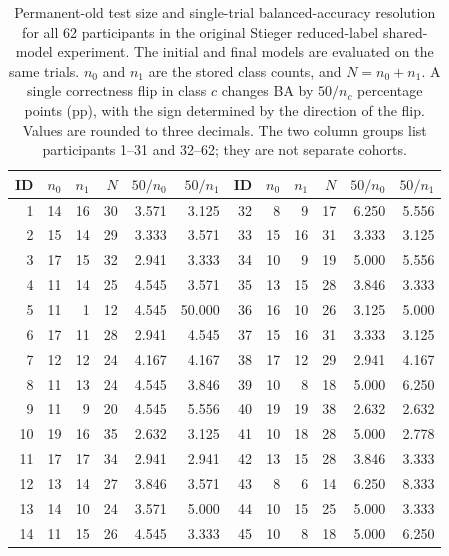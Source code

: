 \documentclass[11pt,a4paper]{article}
\begin{document}
\begin{table}[htbp]
\centering
\small
\setlength{\tabcolsep}{3pt}
\caption{Permanent-old test size and single-trial balanced-accuracy resolution for all 62 participants in the original Stieger reduced-label shared-model experiment. The initial and final models are evaluated on the same trials. $n_0$ and $n_1$ are the stored class counts, and $N=n_0+n_1$. A single correctness flip in class $c$ changes BA by $50/n_c$ percentage points (pp), with the sign determined by the direction of the flip. Values are rounded to three decimals. The two column groups list participants 1--31 and 32--62; they are not separate cohorts.}
\label{tab:old-test-resolution}
\begin{tabular}{@{}rrrrrr@{\hspace{9pt}}rrrrrr@{}}
\toprule
ID & $n_0$ & $n_1$ & $N$ & $50/n_0$ & $50/n_1$ & ID & $n_0$ & $n_1$ & $N$ & $50/n_0$ & $50/n_1$\\
\midrule
1 & 14 & 16 & 30 & 3.571 & 3.125 & 32 & 8 & 9 & 17 & 6.250 & 5.556\\
2 & 15 & 14 & 29 & 3.333 & 3.571 & 33 & 15 & 16 & 31 & 3.333 & 3.125\\
3 & 17 & 15 & 32 & 2.941 & 3.333 & 34 & 10 & 9 & 19 & 5.000 & 5.556\\
4 & 11 & 14 & 25 & 4.545 & 3.571 & 35 & 13 & 15 & 28 & 3.846 & 3.333\\
5 & 11 & 1 & 12 & 4.545 & 50.000 & 36 & 16 & 10 & 26 & 3.125 & 5.000\\
6 & 17 & 11 & 28 & 2.941 & 4.545 & 37 & 15 & 16 & 31 & 3.333 & 3.125\\
7 & 12 & 12 & 24 & 4.167 & 4.167 & 38 & 17 & 12 & 29 & 2.941 & 4.167\\
8 & 11 & 13 & 24 & 4.545 & 3.846 & 39 & 10 & 8 & 18 & 5.000 & 6.250\\
9 & 11 & 9 & 20 & 4.545 & 5.556 & 40 & 19 & 19 & 38 & 2.632 & 2.632\\
10 & 19 & 16 & 35 & 2.632 & 3.125 & 41 & 10 & 18 & 28 & 5.000 & 2.778\\
11 & 17 & 17 & 34 & 2.941 & 2.941 & 42 & 13 & 15 & 28 & 3.846 & 3.333\\
12 & 13 & 14 & 27 & 3.846 & 3.571 & 43 & 8 & 6 & 14 & 6.250 & 8.333\\
13 & 14 & 10 & 24 & 3.571 & 5.000 & 44 & 10 & 15 & 25 & 5.000 & 3.333\\
14 & 11 & 15 & 26 & 4.545 & 3.333 & 45 & 10 & 8 & 18 & 5.000 & 6.250\\

\end{tabular}
\end{table}
\end{document}
